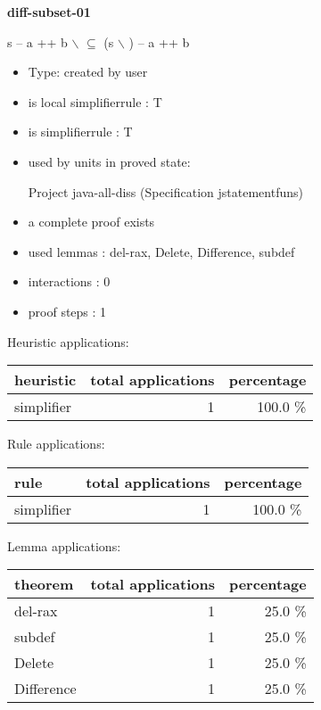 \documentclass[a4paper]{article}
\begin{document}
{\LARGE\bf diff-subset-01}\label{lemma-diff-subset-01}

\medskip

 \Fol s -- a ++ b $\backslash$  $\subseteq$ (s $\backslash$ ) -- a ++ b

\begin{itemize}

\item Type: created by user

\item is local simplifierrule : T
\item is simplifierrule : T
\item used by units in proved state:

Project java-all-diss (Specification jstatementfuns)
\item       a complete proof exists
\item       used lemmas  : del-rax, Delete, Difference, subdef
\item       interactions : 0
\item       proof steps  : 1
\end{itemize}

\medskip


Heuristic applications:

\begin{supertabular}{l|r|r}
heuristic	& total applications & percentage \\ \hline
simplifier & 1 & 100.0 \% \\

\end{supertabular}

Rule applications:

\begin{supertabular}{l|r|r}
rule	        & total applications & percentage \\ \hline
simplifier & 1 & 100.0 \% \\

\end{supertabular}

Lemma applications:

\begin{supertabular}{l|r|r}
theorem	        & total applications & percentage \\ \hline
del-rax & 1 & 25.0 \% \\
subdef & 1 & 25.0 \% \\
Delete & 1 & 25.0 \% \\
Difference & 1 & 25.0 \% \\

\end{supertabular}
\pagebreak
\end{document}
